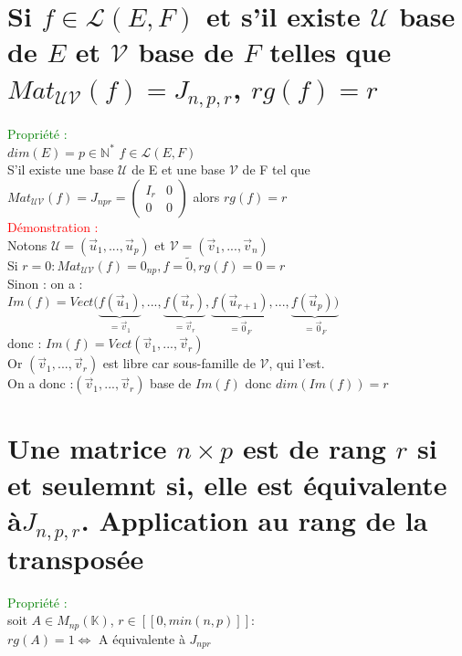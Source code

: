 \documentclass{article}
\begin{document}
        \section{Si $f \in \mathcal L(E,F)$ et s'il existe $\mathcal U$ base de $E$ et $\mathcal V$ base de $F$ telles que $Mat_{\mathcal{UV}}(f)=J_{n,p,r}$, $rg(f)=r$}
				\textcolor{green}{Propriété :} \\
				$dim(E)=p \in \mathbb N^*$ $f \in \mathcal L(E,F)$ \\
				S'il existe une base $\mathcal U$ de E et une base $\mathcal V$ de F tel que $Mat_{\mathcal{UV}}(f)=J_{npr}=\left(\begin{array}{c|c}I _r& 0 \\ \hline0 & 0 \end{array}\right)$ alors $rg(f)=r$ \\
				\textcolor{red}{Démonstration :} \\
				Notons $\mathcal U= (\vec u_1,...,\vec u_p)$ et $\mathcal V=(\vec v_1,...,\vec v_n)$ \\
				Si $r=0:Mat_{\mathcal{UV}}(f)=0_{np},f=\tilde{0},rg(f)=0=r$ \\
				Sinon : on a : \\
				$Im(f)=Vect(\underbrace{f(\vec u_1)}_{=\vec v_1},...,\underbrace{f(\vec u_r)}_{=\vec v_r},\underbrace{f(\vec u_{r+1})}_{=\vec 0_F},...,\underbrace{f(\vec u_p))}_{=\vec 0_F}$ \\
				donc : $Im(f)=Vect(\vec v_1,..., \vec v_r)$ \\
				Or $(\vec v_1,...,\vec v_r)$ est libre car sous-famille de $\mathcal V$, qui l'est. \\
				On a donc :$(\vec v_1,...,\vec v_r)$ base de $Im(f)$ donc $dim(Im(f))=r$
        \section{Une matrice $n \times p$ est de rang $r$ si et seulemnt si, elle est équivalente à$J_{n,p,r}$. Application au rang de la transposée}
				\textcolor{green}{Propriété : } \\
				soit $A \in M_{np}(\mathbb K)$, $r \in [[0,min(n,p)]]$: \\
				$rg(A)=1 \Longleftrightarrow$ A équivalente à $J_{npr}$
\end{document}
